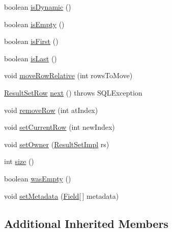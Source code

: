 \begin{DoxyCompactItemize}
\item 
boolean \mbox{\hyperlink{classcom_1_1mysql_1_1jdbc_1_1_row_data_static_a4134efd887590ba3a57bb862079c7491}{is\+Dynamic}} ()
\item 
boolean \mbox{\hyperlink{classcom_1_1mysql_1_1jdbc_1_1_row_data_static_ab306d052b3e0acc34495b3f2ab9ca5ce}{is\+Empty}} ()
\item 
boolean \mbox{\hyperlink{classcom_1_1mysql_1_1jdbc_1_1_row_data_static_a8e4c2612d743e8d39f6434627cc156cd}{is\+First}} ()
\item 
boolean \mbox{\hyperlink{classcom_1_1mysql_1_1jdbc_1_1_row_data_static_a2f803e1be38e80c4d1c89cc3a3f32e38}{is\+Last}} ()
\item 
void \mbox{\hyperlink{classcom_1_1mysql_1_1jdbc_1_1_row_data_static_ae1af87ce2daba5af9430ee3eaa5086ac}{move\+Row\+Relative}} (int rows\+To\+Move)
\item 
\mbox{\hyperlink{classcom_1_1mysql_1_1jdbc_1_1_result_set_row}{Result\+Set\+Row}} \mbox{\hyperlink{classcom_1_1mysql_1_1jdbc_1_1_row_data_static_ac220fe255287ae80ffb925828f4e4865}{next}} ()  throws S\+Q\+L\+Exception 
\item 
void \mbox{\hyperlink{classcom_1_1mysql_1_1jdbc_1_1_row_data_static_a585e76cb9cacd6c1fea15b2d4739f622}{remove\+Row}} (int at\+Index)
\item 
void \mbox{\hyperlink{classcom_1_1mysql_1_1jdbc_1_1_row_data_static_a7ffde91e716fbad68c1ee53657ba969f}{set\+Current\+Row}} (int new\+Index)
\item 
void \mbox{\hyperlink{classcom_1_1mysql_1_1jdbc_1_1_row_data_static_a5fd5d42fb00d069442ff342648023948}{set\+Owner}} (\mbox{\hyperlink{classcom_1_1mysql_1_1jdbc_1_1_result_set_impl}{Result\+Set\+Impl}} rs)
\item 
int \mbox{\hyperlink{classcom_1_1mysql_1_1jdbc_1_1_row_data_static_a68dbbf37a23e7933db5e775de1ec27f5}{size}} ()
\item 
boolean \mbox{\hyperlink{classcom_1_1mysql_1_1jdbc_1_1_row_data_static_a4f28134023a2a4521847430d3cab6cd4}{was\+Empty}} ()
\item 
void \mbox{\hyperlink{classcom_1_1mysql_1_1jdbc_1_1_row_data_static_a499ed56e7c10c7722c80d15a15529d5f}{set\+Metadata}} (\mbox{\hyperlink{classcom_1_1mysql_1_1jdbc_1_1_field}{Field}}\mbox{[}$\,$\mbox{]} metadata)
\end{DoxyCompactItemize}
\subsection*{Additional Inherited Members}



